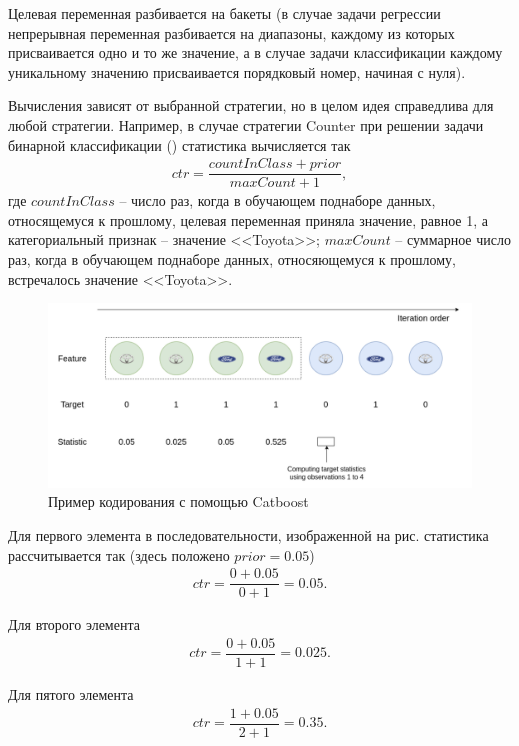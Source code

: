 \documentclass[%
	11pt,
	a4paper,
	utf8,
		]{article}
\begin{document}
Целевая переменная разбивается на бакеты (в случае задачи регрессии непрерывная переменная разбивается на диапазоны, каждому из которых присваивается одно и то же значение, а в случае задачи классификации каждому уникальному значению присваивается порядковый номер, начиная с нуля).

Вычисления зависят от выбранной стратегии, но в целом идея справедлива для любой стратегии. Например, в случае стратегии Counter при решении задачи бинарной классификации () статистика вычисляется так
\begin{align*}
	ctr = \dfrac{ countInClass + prior }{maxCount + 1},
\end{align*}
где $ countInClass $ -- число раз, когда в обучающем поднаборе данных, относящемуся к прошлому, целевая переменная приняла значение, равное 1, а категориальный признак -- значение <<Toyota>>; $ maxCount $ -- суммарное число раз, когда в обучающем поднаборе данных, относяющемуся к прошлому, встречалось значение <<Toyota>>.

\begin{figure}[h]
	\centering
	\includegraphics[scale=0.65]{figures/catboost_encoding.png}
	\caption{ Пример кодирования с помощью Catboost }\label{fig:catboost_encoding}
\end{figure}

Для первого элемента в последовательности, изображенной на рис.  статистика рассчитывается так (здесь положено $ prior = 0.05 $)
\begin{align*}
	ctr = \dfrac{ 0 + 0.05 }{ 0 + 1} = 0.05.
\end{align*}

Для второго элемента
\begin{align*}
	ctr = \dfrac{ 0 + 0.05 }{ 1 + 1 } = 0.025.
\end{align*}

Для пятого элемента
\begin{align*}
	ctr = \dfrac{ 1 + 0.05 }{ 2 + 1} = 0.35.
\end{align*}
\end{document}
